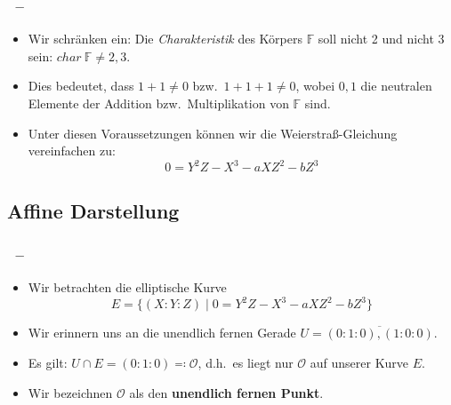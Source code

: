 \documentclass{beamer}
\theoremstyle{plain}
\theoremstyle{definition}
\theoremstyle{rem}
\newcommand{\patinf}{\mathcal{O}}
\begin{document}
\begin{frame}
\frametitle{\insertsection~--~\insertsubsection}
\begin{itemize}[<+->]
	\item  Wir schränken ein: Die \textit{Charakteristik} des Körpers $\mathbb{F}$ soll nicht 2 und nicht 3 sein: $char \: \mathbb{F} \neq 2,3$.
	\item Dies bedeutet, dass $1 + 1 \neq 0$ bzw.\ $1 + 1 + 1 \neq 0$, wobei $0,1$ die neutralen Elemente der Addition bzw.\ Multiplikation von $\mathbb{F}$ sind. 
	\item Unter diesen Voraussetzungen können wir die Weierstraß-Gleichung vereinfachen zu:
    \begin{equation*}
        0=Y^2Z - X^3 - aXZ^2 - bZ^3
    \end{equation*}
\end{itemize}
\end{frame}

\subsection{Affine Darstellung}

\begin{frame}
\frametitle{\insertsection~--~\insertsubsection}
\begin{itemize}[<+->]
	\item Wir betrachten die elliptische Kurve
		\begin{equation*}
			E=\{(X:Y:Z)\mid 0=Y^2Z - X^3 - aXZ^2 - bZ^3\}
		\end{equation*}
	\item Wir erinnern uns an die unendlich fernen Gerade $U=\overline{(0:1:0),(1:0:0)}$.
	\item Es gilt: $U\cap E=(0:1:0)\eqqcolon\patinf$, d.h.\ es liegt nur $\patinf$ auf unserer Kurve $E$.
	\item Wir bezeichnen $\patinf$ als den \textbf{unendlich fernen Punkt}.
\end{itemize}
\end{frame}

\end{document}
